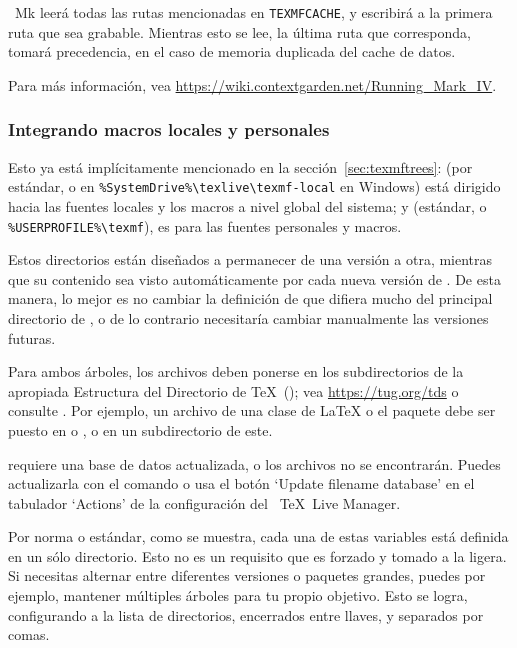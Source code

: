 \documentclass{article}
\begin{document}
\ConTeXt\ Mk leerá todas las rutas mencionadas en
\verb+TEXMFCACHE+, y escribirá a la primera ruta que sea grabable.
Mientras esto se lee, la última ruta que corresponda, tomará precedencia,
en el caso de memoria duplicada del cache de datos. 

Para más información, vea 
\url{https://wiki.contextgarden.net/Running_Mark_IV}.

\subsubsection{Integrando macros locales y personales}
\label{sec:local-personal-macros}

Esto ya está implícitamente mencionado en la
sección~\ref{sec:texmftrees}: 
 (por estándar,
 o en
\verb|%SystemDrive%\texlive\texmf-local| en Windows)
está dirigido hacia las fuentes locales y los macros a nivel global
del sistema; y  (estándar,  o
\verb|%USERPROFILE%\texmf|), es para las fuentes personales y macros.

Estos directorios están diseñados a permanecer de una versión a otra,
mientras que su contenido sea visto automáticamente por cada nueva
versión de \TL{}. De esta manera, lo mejor es no cambiar la definición
de  que difiera mucho del principal directorio de
\TL{}, o de lo contrario necesitaría cambiar manualmente las versiones
futuras. 


Para ambos árboles, los archivos deben ponerse en los subdirectorios
de la apropiada Estructura del Directorio de \TeX\ (\TDS); vea
\url{https://tug.org/tds} o consulte
. Por ejemplo, un archivo de una
clase de \LaTeX{}
o 
el paquete debe ser puesto en  o
, o en un subdirectorio de este.

 requiere una base de datos actualizada, o los
archivos no se encontrarán. Puedes actualizarla con el comando
 o usa el botón `Update filename database' en el
tabulador `Actions' de la configuración del \GUI\ \TeX\ Live Manager. 

Por norma o estándar, como se muestra, cada una de estas variables está
definida en un sólo directorio. Esto no es
un requisito que es forzado y tomado a la ligera. Si necesitas alternar entre
diferentes versiones o paquetes grandes, puedes por ejemplo, 
mantener múltiples árboles para tu propio
objetivo. Esto se logra, configurando  a la lista de directorios, 
encerrados entre llaves, y separados por comas.
\end{document}
